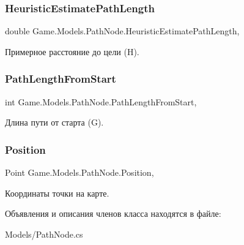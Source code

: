 \subsubsection{\texorpdfstring{Heuristic\+Estimate\+Path\+Length}{HeuristicEstimatePathLength}}
{\footnotesize\ttfamily double Game.\+Models.\+Path\+Node.\+Heuristic\+Estimate\+Path\+Length\hspace{0.3cm}{\ttfamily [get]}, {\ttfamily [set]}}



Примерное расстояние до цели (H). 

\mbox{\label{class_game_1_1_models_1_1_path_node_ad0b667e8fc2377ce0c41576cfa382b15}} 
\subsubsection{\texorpdfstring{Path\+Length\+From\+Start}{PathLengthFromStart}}
{\footnotesize\ttfamily int Game.\+Models.\+Path\+Node.\+Path\+Length\+From\+Start\hspace{0.3cm}{\ttfamily [get]}, {\ttfamily [set]}}



Длина пути от старта (G). 

\mbox{\label{class_game_1_1_models_1_1_path_node_a6cece93479e46b7e12f1cb55a5ed8efc}} 
\subsubsection{\texorpdfstring{Position}{Position}}
{\footnotesize\ttfamily Point Game.\+Models.\+Path\+Node.\+Position\hspace{0.3cm}{\ttfamily [get]}, {\ttfamily [set]}}



Координаты точки на карте. 



Объявления и описания членов класса находятся в файле\+:\begin{DoxyCompactItemize}
\item 
Models/Path\+Node.\+cs\end{DoxyCompactItemize}
